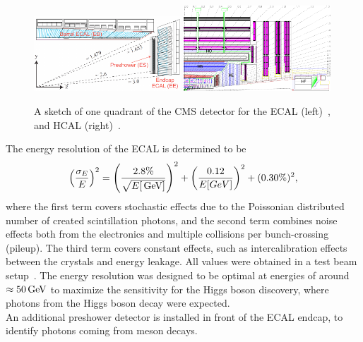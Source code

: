 \begin{figure}[tbp]
 \centering
 \includegraphics[width=0.49\textwidth]{figures/general/ecal}
 \includegraphics[width=0.49\textwidth]{figures/general/hcal}
 \caption{A sketch of one quadrant of the CMS detector for the ECAL (left)~\cite{ECALPicture}, and HCAL (right)~\cite{CMS}.}
 \label{fig:etaPlaneCMS}
\end{figure}
The energy resolution of the ECAL is determined to be
\begin{equation}
 \left(\frac{\sigma_E}{E}\right)^2=\left(\frac{2.8\%}{\sqrt{E[\,\text{Ge\hspace{-.08em}V}]}}\right)^2 + \left(\frac{0.12}{E[GeV]}\right)^2 + (0.30\%)^2,
\end{equation}
where the first term covers stochastic effects due to the Poissonian distributed number of created scintillation photons, and the second term combines noise effects both from the electronics and multiple collisions per bunch-crossing (pileup). The third term covers constant effects, such as intercalibration effects between the crystals and energy leakage. All values were obtained in a test beam setup~\cite{ECALRes}. The energy resolution was designed to be optimal at energies of around $\approx50\,\text{Ge\hspace{-.08em}V}$ to maximize the sensitivity for the Higgs boson discovery, where photons from the Higgs boson decay were expected.\\
An additional preshower detector is installed in front of the ECAL endcap, to identify photons coming from meson decays.

